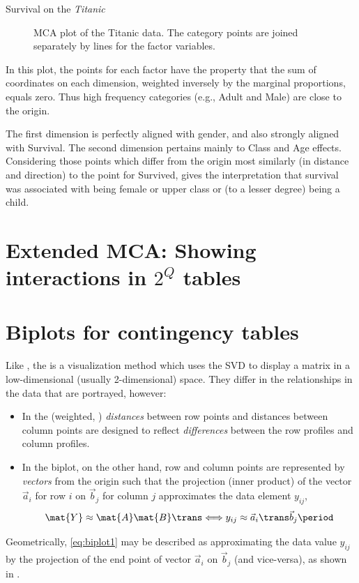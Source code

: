 \documentclass[11pt]{book}
\renewenvironment{knitrout}{\small\renewcommand{\baselinestretch}{.85}}{} %
\begin{document}
\begin{Example}[titanic2]{Survival on the \emph{Titanic}}
\begin{knitrout}
\begin{figure}[!htb]
\caption[MCA plot of the Titanic data]{MCA plot of the Titanic data. The category points are joined separately by lines for the factor variables.\label{fig:titanic-mca-plot}}
\end{figure}


\end{knitrout}

In this plot, the points for each factor have the property that the sum of coordinates
on each dimension, weighted inversely by the marginal proportions, equals
zero. Thus
high frequency categories (e.g., Adult and Male) are close to the origin.

The first dimension is perfectly aligned with gender, and also
strongly aligned with Survival.  The second dimension pertains mainly to
Class and Age effects.  Considering those points which differ from the
origin most similarly (in distance and direction) to the point for Survived,
gives the interpretation that survival was associated with being female
or upper class or (to a lesser degree) being a child.


\end{Example}

\section{Extended MCA: Showing interactions in $2^Q$ tables}\label{sec:ca-mcainter}

\section{Biplots for contingency tables}\label{sec:biplot}

Like \ca, the 
\citep{BraduGabriel:78,Gabriel:71,Gabriel:80,Gabriel:81,Gower-etal:2011}
is a visualization method
which uses the SVD to display a matrix in a low-dimensional
(usually 2-dimensional) space.
They differ in the relationships in the data that are portrayed,
however:
\begin{itemize}
  \item In \ca the (weighted, \chisq) \emph{distances} between row points and
  distances between column points are designed to reflect \emph{differences} between the row profiles
  and column profiles.

  \item In the biplot, on the other hand,
  row and column points are represented by \emph{vectors} from the origin
  such that the projection 
  (inner product) of the vector $\vec{a}_i$ for row $i$
  on $\vec{b}_j$ for column $j$ approximates the data element
  $y_{ij}$,
\begin{equation}\label{eq:biplot1}
 \mat{Y} \approx \mat{A} \mat{B}\trans \Longleftrightarrow
 y_{ij} \approx \vec{a}_i \trans \vec{b}_j
 \period
\end{equation}
\end{itemize}
Geometrically, \eqref{eq:biplot1} may be described as approximating the data value $y_{ij}$
by the projection of the end point of vector $\vec{a}_i$
on $\vec{b}_j$ (and vice-versa), as shown in .
\end{document}

